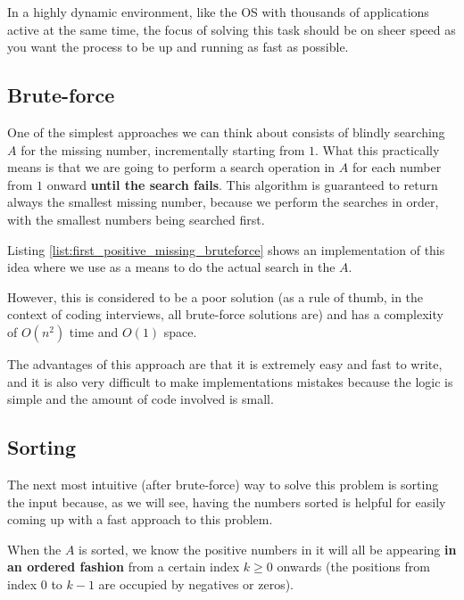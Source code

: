 In a highly dynamic environment, like the OS with thousands of applications active at the same time, the focus of solving this task should be on sheer speed as you want the process to be up and running as fast as possible. 


\subsection{Brute-force}
One of the simplest approaches we can think about consists of blindly searching $A$ for the missing number, incrementally starting from $1$. 
What this practically means is that we are going to perform a search operation in $A$ for each number from $1$ onward \textbf{until the search fails}.
This algorithm is guaranteed to return always the smallest missing number, because we perform the searches in order, with the smallest numbers being searched first. 

Listing \ref{list:first_positive_missing_bruteforce} shows an implementation of this idea where we use  as a means to do the actual search in the $A$. 
 


However, this is considered to be a poor solution (as a rule of thumb, in the context of coding interviews, all brute-force solutions are) and has a
complexity of $O(n^2)$ time and $O(1)$ space.

The advantages of this approach are that it is extremely easy and fast to write, and it is also very difficult to make implementations mistakes because the logic is simple and the amount of code involved is small.


\subsection{Sorting}
\label{first_positive_missing:sec:sorting}

The next most intuitive (after brute-force) way to solve this problem is sorting the input because, as we will see, having the numbers sorted is helpful for easily coming up with a fast approach to this problem.

When the $A$ is sorted, we know the positive numbers in it will all be appearing \textbf{in an ordered fashion} from a certain index $k\geq 0$ onwards (the positions from index $0$ to $k-1$ are occupied by negatives or zeros). 

